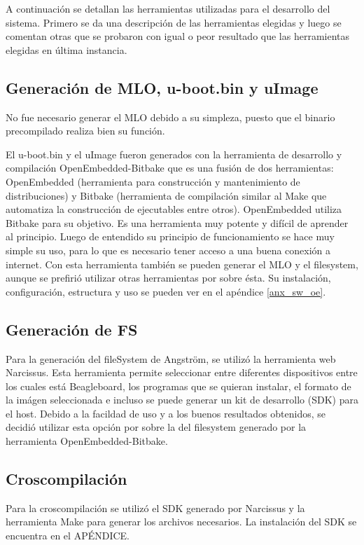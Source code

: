 A continuación se detallan las herramientas utilizadas para el desarrollo del sistema. 
Primero se da una descripción de las herramientas elegidas y luego se comentan otras que se probaron con igual o peor resultado que las herramientas elegidas en última instancia.

\subsection{Generación de MLO, u-boot.bin y uImage}
No fue necesario generar el MLO debido a su simpleza, puesto que el binario precompilado realiza bien su función.

El u-boot.bin y el uImage fueron generados con la herramienta de desarrollo y compilación OpenEmbedded-Bitbake que es una fusión de dos herramientas: OpenEmbedded (herramienta para construcción y mantenimiento de distribuciones) y Bitbake (herramienta de compilación similar al Make que automatiza la construcción de ejecutables entre otros). OpenEmbedded utiliza Bitbake para su objetivo. Es una herramienta muy potente y difícil de aprender al principio. Luego de entendido su principio de funcionamiento se hace muy simple su uso, para lo que es necesario tener acceso a una buena conexión a internet.
Con esta herramienta también se pueden generar el MLO y el filesystem, aunque se prefirió utilizar otras herramientas por sobre ésta. 
Su instalación, configuración, estructura y uso se pueden ver en el apéndice \ref{anx_sw_oe}.

\subsection{Generación de FS}
Para la generación del fileSystem de Angström, se utilizó la herramienta web Narcissus.
Esta herramienta permite seleccionar entre diferentes dispositivos entre los cuales está Beagleboard, los programas que se quieran instalar, el formato de la imágen seleccionada e incluso se puede generar un kit de desarrollo (SDK) para el host. Debido a la facildad de uso y a los buenos resultados obtenidos, se decidió utilizar esta opción por sobre la del filesystem generado por la herramienta OpenEmbedded-Bitbake.

\subsection{Croscompilación}
Para la croscompilación se utilizó el SDK generado por Narcissus y la herramienta Make para generar los archivos necesarios. La instalación del SDK se encuentra en el APÉNDICE.

